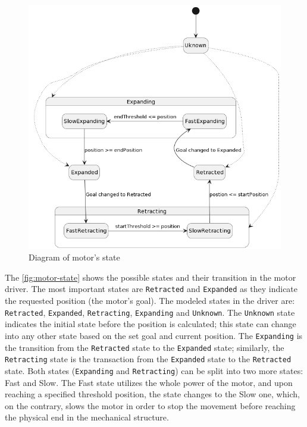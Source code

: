 \documentclass[
  digital,     %
  oneside,     %
  nosansbold,  %
  nocolorbold, %
  nolof,         %
  nolot,         %
]{fithesis4}
\begin{document}
{{{\begin{figure}
    \includegraphics[width=\textwidth,height=\textheight,keepaspectratio]{assets/motor-state-diagram-wip.png}
    \caption{Diagram of motor's state}
    \label{fig:motor-state}
\end{figure}

The \autoref{fig:motor-state} shows the possible states and their transition in the motor driver. The most important states are \lstinline|Retracted| and \lstinline|Expanded| as they indicate the requested position (the motor's goal). The modeled states in the driver are: \lstinline|Retracted|, \lstinline|Expanded|, \lstinline|Retracting|, \lstinline|Expanding| and \lstinline|Unknown|. The \lstinline|Unknown| state indicates the initial state before the position is calculated; this state can change into any other state based on the set goal and current position. The \lstinline|Expanding| is the transition from the \lstinline|Retracted| state to the \lstinline|Expanded| state; similarly, the \lstinline|Retracting| state is the transaction from the \lstinline|Expanded| state to the \lstinline|Retracted| state. Both states (\lstinline|Expanding| and \lstinline|Retracting|) can be split into two more states: Fast and Slow. The Fast state utilizes the whole power of the motor, and upon reaching a specified threshold position, the state changes to the Slow one, which, on the contrary, slows the motor in order to stop the movement before reaching the physical end in the mechanical structure.

}}}
\end{document}
